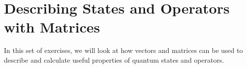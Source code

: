 %
%
%
%

\section*{Describing States and Operators with Matrices}

	In this set of exercises, we will look at how vectors and matrices can be used to describe and calculate useful properties of quantum states and operators.

